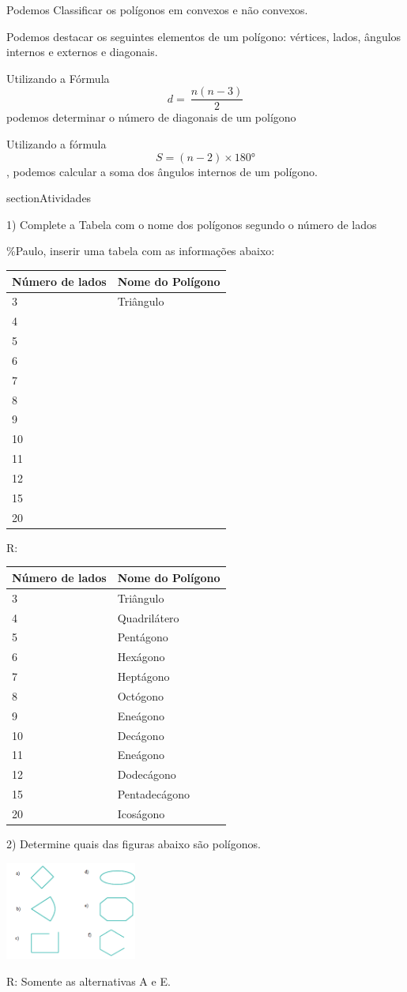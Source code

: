Podemos Classificar os polígonos em convexos e não convexos.

Podemos destacar os seguintes elementos de um polígono: vértices, lados,
ângulos internos e externos e diagonais.

Utilizando a Fórmula \[d = \ \frac{n(n - 3)}{2}\] podemos determinar o
número de diagonais de um polígono

Utilizando a fórmula \[S = (n - 2) \times 180°\], podemos calcular a
soma dos ângulos internos de um polígono.

section{Atividades}

1) Complete a Tabela com o nome dos polígonos segundo o número de lados

\%Paulo, inserir uma tabela com as informações abaixo:

\begin{longtable}[]{@{}ll@{}}
\toprule
Número de lados & Nome do Polígono\tabularnewline
\midrule
\endhead
3 & Triângulo\tabularnewline
4 & ~\tabularnewline
5 & ~\tabularnewline
6 & ~\tabularnewline
7 & ~\tabularnewline
8 & ~\tabularnewline
9 & ~\tabularnewline
10 & ~\tabularnewline
11 & ~\tabularnewline
12 & ~\tabularnewline
15 & ~\tabularnewline
20 & ~\tabularnewline
\bottomrule
\end{longtable}

R:

\begin{longtable}[]{@{}ll@{}}
\toprule
Número de lados & Nome do Polígono\tabularnewline
\midrule
\endhead
3 & Triângulo\tabularnewline
4 & Quadrilátero\tabularnewline
5 & Pentágono\tabularnewline
6 & Hexágono\tabularnewline
7 & Heptágono\tabularnewline
8 & Octógono\tabularnewline
9 & Eneágono\tabularnewline
10 & Decágono\tabularnewline
11 & Eneágono\tabularnewline
12 & Dodecágono\tabularnewline
15 & Pentadecágono\tabularnewline
20 & Icoságono\tabularnewline
\bottomrule
\end{longtable}

2) Determine quais das figuras abaixo são polígonos.

\includegraphics[width=1.7in,height=1.26763in]{./imgSAEB_8_MAT/media/image7.png}

R: Somente as alternativas A e E.

